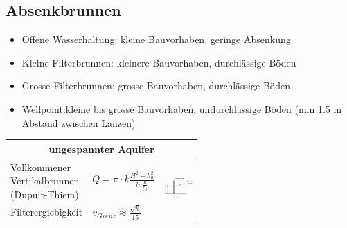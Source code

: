 \begin{minipage}{\linewidth}
	\vspace{-0.5cm}
\subsection{Absenkbrunnen}
	
	\begin{itemize}
		\item Offene Wasserhaltung: kleine Bauvorhaben, geringe Absenkung
		\item Kleine Filterbrunnen: kleinere Bauvorhaben, durchlässige Böden
		\item Grosse Filterbrunnen: grosse Bauvorhaben, durchlässige Böden
		\item Wellpoint:kleine bis grosse Bauvorhaben, undurchlässige Böden (min 1.5 m Abstand zwischen Lanzen)
		
	\end{itemize}

%
		\begin{tabular}{p{0.3\linewidth}|l|p{0.25\linewidth}}
					
			\multicolumn{3}{c|}{ \textbf{ungespannter Aquifer} } \\ \hline
			
			Vollkommener Vertikalbrunnen (Dupuit-Thiem) & $ Q = \pi \cdot k \frac{H^2 - h_0^2}{ln \frac{R}{r_0} } $	& \multirow{2}{*}{\includegraphics[width=0.8\linewidth]{images/GW9ungespAquifer.PNG}}  \\
			Filterergiebigkeit & $ v_{Grenz} \hat{\approx} \frac{\sqrt{k}}{15}$	&\\ \hline
			

\end{tabular}
\end{minipage}
